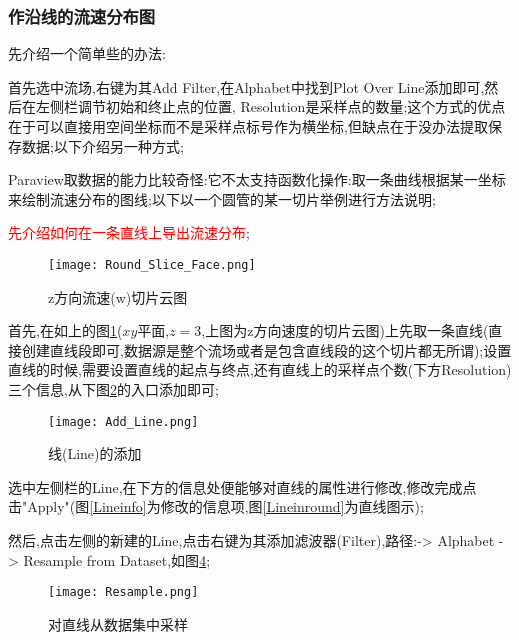\subsubsection{作沿线的流速分布图}
先介绍一个简单些的办法:\par

首先选中流场,右键为其Add Filter,在Alphabet中找到Plot Over Line添加即可,然后在左侧栏调节初始和终止点的位置, Resolution是采样点的数量;这个方式的优点在于可以直接用空间坐标而不是采样点标号作为横坐标,但缺点在于没办法提取保存数据;以下介绍另一种方式;\par

Paraview取数据的能力比较奇怪:它不太支持函数化操作:取一条曲线根据某一坐标来绘制流速分布的图线;以下以一个圆管的某一切片举例进行方法说明;\par
\textcolor{red}{先介绍如何在一条直线上导出流速分布};

\begin{figure}[h]
	\noindent
	\centering
	\texttt{[image: Round\_Slice\_Face.png]}
	\caption{z方向流速(w)切片云图}
	\label{roundsliceface}
\end{figure}


首先,在如上的图\ref{roundsliceface}($xy$平面,$z=3$,上图为z方向速度的切片云图)上先取一条直线(直接创建直线段即可,数据源是整个流场或者是包含直线段的这个切片都无所谓);设置直线的时候,需要设置直线的起点与终点,还有直线上的采样点个数(下方Resolution)三个信息,从下图\ref{addline}的入口添加即可;
\begin{figure}[h]
	\noindent
	\centering
	\texttt{[image: Add\_Line.png]}
	\caption{线(Line)的添加}
	\label{addline}
\end{figure}
选中左侧栏的Line,在下方的信息处便能够对直线的属性进行修改,修改完成点击"Apply"(图\ref{Lineinfo}为修改的信息项,图\ref{Lineinround}为直线图示);\par


\begin{figure}[H]
	\centering  %
	\label{lineresample}
\end{figure}

然后,点击左侧的新建的Line,点击右键为其添加滤波器(Filter),路径:-> Alphabet -> Resample from Dataset,如图\ref{Resampledataset};\par

\begin{figure}[h]
	\noindent
	\centering
	\texttt{[image: Resample.png]}
	\caption{对直线从数据集中采样}
	\label{Resampledataset}
\end{figure}

